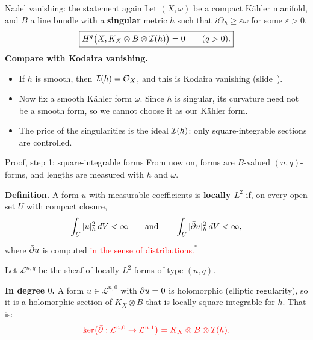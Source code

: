 \begin{frame}{Nadel vanishing: the statement again}
Let \((X,\omega)\) be a compact Kähler manifold, and \(B\) a line bundle with a \textbf{singular} metric \(h\) such that \(i\Theta_h\ge\varepsilon\omega\) for some \(\varepsilon>0\).
\[
\boxed{H^q\bigl(X,K_X\otimes B\otimes\mathcal I(h)\bigr)=0\qquad(q>0).}
\]
\textbf{Compare with Kodaira vanishing.}
\begin{itemize}
\setlength{\itemsep}{6pt}
\item If \(h\) is smooth, then \(\mathcal I(h)=\mathcal O_X\), and this is Kodaira vanishing (slide~\hyperlink{fr:what-we-just-proved-29}{\pageref{fr:what-we-just-proved-29}}).
\item Now fix a smooth Kähler form \(\omega\). Since \(h\) is singular, its curvature need not be a smooth form, so we cannot choose it as our Kähler form.
\item The price of the singularities is the ideal \(\mathcal I(h)\): only square-integrable sections are controlled.
\end{itemize}
\end{frame}

\begin{frame}{Proof, step 1: square-integrable forms}
\label{fr:nadel-step1}
From now on, forms are \(B\)-valued \((n,q)\)-forms, and lengths are measured with \(h\) and \(\omega\).
\par\smallskip
\textbf{Definition.} A form \(u\) with measurable coefficients is \textbf{locally \(L^2\)} if, on every open set \(U\) with compact closure,
\[
\int_U|u|_h^2\,dV<\infty
\qquad\text{and}\qquad
\int_U|\bar\partial u|_h^2\,dV<\infty ,
\]
where \(\bar\partial u\) is computed \textcolor{red}{in the sense of distributions.}\textsuperscript{*}
\par\smallskip
Let \(\mathcal L^{n,q}\) be the sheaf of locally \(L^2\) forms of type \((n,q)\).
\par\medskip
\textbf{In degree \(0\).} A form \(u\in\mathcal L^{n,0}\) with \(\bar\partial u=0\) is holomorphic (elliptic regularity), so it is a holomorphic section of \(K_X\otimes B\) that is locally square-integrable for \(h\). That is:
\[
{\color{red}\ker\bigl(\bar\partial:\mathcal L^{n,0}\to\mathcal L^{n,1}\bigr)=K_X\otimes B\otimes\mathcal I(h).}
\]
\end{frame}

